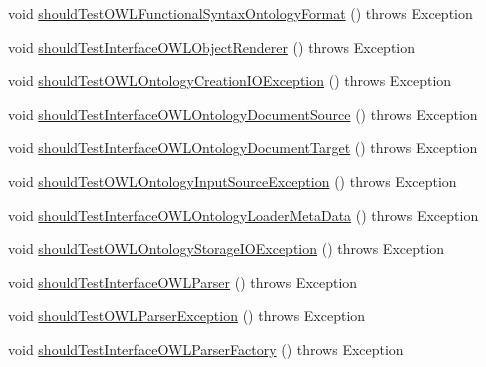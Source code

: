 \begin{DoxyCompactItemize}
\item 
void \hyperlink{classorg_1_1semanticweb_1_1owlapi_1_1contract_1_1_contract_owlapi_io_test_a990b2d7da8d665ef1f30b6545725f377}{should\-Test\-O\-W\-L\-Functional\-Syntax\-Ontology\-Format} ()  throws Exception 
\item 
void \hyperlink{classorg_1_1semanticweb_1_1owlapi_1_1contract_1_1_contract_owlapi_io_test_aa164b0e7ec9fa47d9ade86385a017e83}{should\-Test\-Interface\-O\-W\-L\-Object\-Renderer} ()  throws Exception 
\item 
void \hyperlink{classorg_1_1semanticweb_1_1owlapi_1_1contract_1_1_contract_owlapi_io_test_a41ccbe9868eca9c7efef6164eaf5e68f}{should\-Test\-O\-W\-L\-Ontology\-Creation\-I\-O\-Exception} ()  throws Exception 
\item 
void \hyperlink{classorg_1_1semanticweb_1_1owlapi_1_1contract_1_1_contract_owlapi_io_test_ac778569d4ff5a91bffd1462e48813eb9}{should\-Test\-Interface\-O\-W\-L\-Ontology\-Document\-Source} ()  throws Exception 
\item 
void \hyperlink{classorg_1_1semanticweb_1_1owlapi_1_1contract_1_1_contract_owlapi_io_test_af9a6d789ad6fad88bf7d9c119fc5e269}{should\-Test\-Interface\-O\-W\-L\-Ontology\-Document\-Target} ()  throws Exception 
\item 
void \hyperlink{classorg_1_1semanticweb_1_1owlapi_1_1contract_1_1_contract_owlapi_io_test_a79530a05c4bf4e20190ea2c2f6fcc23d}{should\-Test\-O\-W\-L\-Ontology\-Input\-Source\-Exception} ()  throws Exception 
\item 
void \hyperlink{classorg_1_1semanticweb_1_1owlapi_1_1contract_1_1_contract_owlapi_io_test_a7c954bad717602ff156a4ed8473832bc}{should\-Test\-Interface\-O\-W\-L\-Ontology\-Loader\-Meta\-Data} ()  throws Exception 
\item 
void \hyperlink{classorg_1_1semanticweb_1_1owlapi_1_1contract_1_1_contract_owlapi_io_test_ade38086819fe45b8c177d1a8f7fdf68e}{should\-Test\-O\-W\-L\-Ontology\-Storage\-I\-O\-Exception} ()  throws Exception 
\item 
void \hyperlink{classorg_1_1semanticweb_1_1owlapi_1_1contract_1_1_contract_owlapi_io_test_a4468add26f1a2ab67e340790e6d47f4a}{should\-Test\-Interface\-O\-W\-L\-Parser} ()  throws Exception 
\item 
void \hyperlink{classorg_1_1semanticweb_1_1owlapi_1_1contract_1_1_contract_owlapi_io_test_a01e97b532a962b9d4501fe02afdcf4ea}{should\-Test\-O\-W\-L\-Parser\-Exception} ()  throws Exception 
\item 
void \hyperlink{classorg_1_1semanticweb_1_1owlapi_1_1contract_1_1_contract_owlapi_io_test_a882954561413b1d1b2f91403d3d89bd4}{should\-Test\-Interface\-O\-W\-L\-Parser\-Factory} ()  throws Exception 

\end{DoxyCompactItemize}
